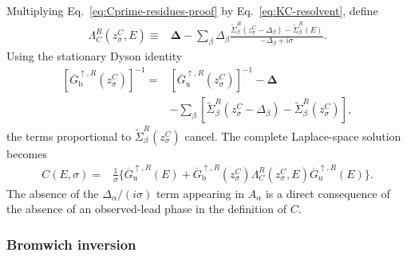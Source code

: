 \documentclass[
 reprint,
 superscriptaddress,
 amsmath,amssymb,
 aps,prb,
 longbibliography,
 floatfix
]{revtex4-2}
\begin{document}
Multiplying Eq.~\eqref{eq:Cprime-residues-proof} by Eq.~\eqref{eq:KC-resolvent}, define
\begin{equation*}
\begin{aligned}
\Lambda_C^R(z_\sigma^C,E)
\equiv{}&
\bm\Delta
-
\sum_\beta
\Delta_\beta
\frac{
\widetilde\Sigma_\beta^R(z_\sigma^C-\Delta_\beta)
-
\widetilde\Sigma_\beta^R(E)}
{-\Delta_\beta+i\sigma}.
\end{aligned}
\end{equation*}
Using the stationary Dyson identity
\begin{equation*}
\begin{aligned}
\left[
\overline G_{\mathrm b}^{\uparrow,R}(z_\sigma^C)
\right]^{-1}
={}&
\left[
\overline G_{\mathrm u}^{\uparrow,R}(z_\sigma^C)
\right]^{-1}
-\bm\Delta
\\
&-
\sum_\beta
\left[
\widetilde\Sigma_\beta^R(z_\sigma^C-\Delta_\beta)
-
\widetilde\Sigma_\beta^R(z_\sigma^C)
\right],
\end{aligned}
\end{equation*}
the terms proportional to $\widetilde\Sigma_\beta^R(z_\sigma^C)$ cancel. The complete Laplace-space solution becomes
\begin{equation}
\begin{aligned}
C(E,\sigma)
={}&
\frac{1}{\sigma}
\Bigg\{
\overline G_{\mathrm u}^{\uparrow,R}(E)
+
\overline G_{\mathrm b}^{\uparrow,R}(z_\sigma^C)
\Lambda_C^R(z_\sigma^C,E)
\overline G_{\mathrm u}^{\uparrow,R}(E)
\Bigg\}.
\end{aligned}
\label{eq:Cup-laplace-compact}
\end{equation}
The absence of the $\Delta_\alpha/(i\sigma)$ term appearing in $A_\alpha$ is a direct consequence of the absence of an observed-lead phase in the definition of $C$.

\subsubsection{Bromwich inversion}
\end{document}
